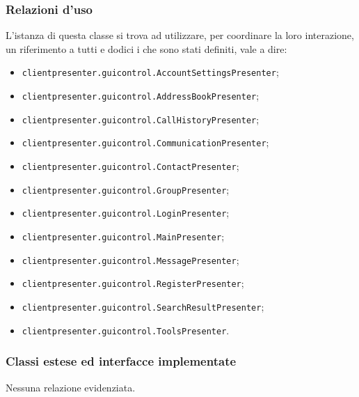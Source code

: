 \subsubsection*{Relazioni d'uso}
L'istanza di questa classe si trova ad utilizzare, per coordinare la loro interazione, un riferimento a tutti e dodici i che sono stati definiti, vale a dire:
\begin{itemize}
  \item \texttt{clientpresenter.guicontrol.AccountSettingsPresenter};
  \item \texttt{clientpresenter.guicontrol.AddressBookPresenter};
  \item \texttt{clientpresenter.guicontrol.CallHistoryPresenter};
  \item \texttt{clientpresenter.guicontrol.CommunicationPresenter};
  \item \texttt{clientpresenter.guicontrol.ContactPresenter};
  \item \texttt{clientpresenter.guicontrol.GroupPresenter};
  \item \texttt{clientpresenter.guicontrol.LoginPresenter};
  \item \texttt{clientpresenter.guicontrol.MainPresenter};
  \item \texttt{clientpresenter.guicontrol.MessagePresenter};
  \item \texttt{clientpresenter.guicontrol.RegisterPresenter};
  \item \texttt{clientpresenter.guicontrol.SearchResultPresenter};
  \item \texttt{clientpresenter.guicontrol.ToolsPresenter}.
\end{itemize}

\subsubsection*{Classi estese ed interfacce implementate}
Nessuna relazione evidenziata.

